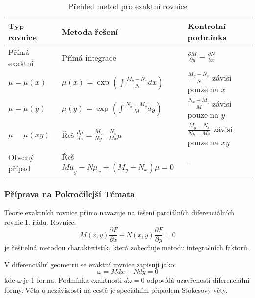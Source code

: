 \vspace{0.8\baselineskip}

\begin{table}[h]
\centering
\caption{Přehled metod pro exaktní rovnice}
\label{tab:prehled-metod}
\begin{tabular}{p{}p{}p{}}
\toprule
\textbf{Typ rovnice} & \textbf{Metoda řešení} & \textbf{Kontrolní podmínka} \\
\midrule
Přímá exaktní & Přímá integrace & $\frac{\partial M}{\partial y} = \frac{\partial N}{\partial x}$ \\
$\mu = \mu(x)$ & $\mu(x) = \exp\left(\int \frac{M_y - N_x}{N} dx\right)$ & $\frac{M_y - N_x}{N}$ závisí pouze na $x$ \\
$\mu = \mu(y)$ & $\mu(y) = \exp\left(\int \frac{N_x - M_y}{M} dy\right)$ & $\frac{N_x - M_y}{M}$ závisí pouze na $y$ \\
$\mu = \mu(xy)$ & Řeš $\frac{d\mu}{dz} = \frac{M_y - N_x}{Ny - Mx} \mu$ & $\frac{M_y - N_x}{Ny - Mx}$ závisí pouze na $xy$ \\
Obecný případ & Řeš $M\mu_y - N\mu_x + (M_y - N_x)\mu = 0$ & - \\
\bottomrule
\end{tabular}
\end{table}

\vspace{0.8\baselineskip}

\subsubsection{Příprava na Pokročilejší Témata}
\label{subsubsec:priprava-pokrocila-temata}

\begin{transition}
Teorie exaktních rovnice přímo navazuje na řešení parciálních diferenciálních rovnic 1. řádu. Rovnice:
\[
M(x, y) \frac{\partial F}{\partial x} + N(x, y) \frac{\partial F}{\partial y} = 0
\]
je řešitelná metodou charakteristik, která zobecňuje metodu integračních faktorů.
\end{transition}

\vspace{0.6\baselineskip}

\begin{transition}
V diferenciální geometrii se exaktní rovnice zapisují jako:
\[
\omega = M dx + N dy = 0
\]
kde $\omega$ je 1-forma. Podmínka exaktnosti $d\omega = 0$ odpovídá uzavřenosti diferenciální formy. Věta o nezávislosti na cestě je speciálním případem Stokesovy věty.
\end{transition}

